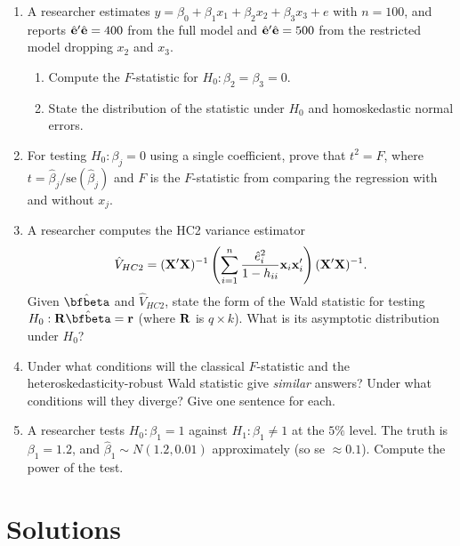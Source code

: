 \documentclass{article}
\begin{document}
\begin{enumerate}[label=\textbf{C.\arabic*},leftmargin=*,itemsep=10pt]

\item  A researcher estimates $y = \beta_0 + \beta_1 x_1 + \beta_2 x_2 + \beta_3 x_3 + e$ with $n = 100$, and reports $\hat{{\mathbf e}}'\hat{{\mathbf e}} = 400$ from the full model and $\hat{{\mathbf e}}'\hat{{\mathbf e}} = 500$ from the restricted model dropping $x_2$ and $x_3$.
\begin{enumerate}[label=(\alph*)]
  \item Compute the $F$-statistic for $H_0: \beta_2 = \beta_3 = 0$.
  \item State the distribution of the statistic under $H_0$ and homoskedastic normal errors.
\end{enumerate}

\item  For testing $H_0: \beta_j = 0$ using a single coefficient, prove that $t^2 = F$, where $t = \hat\beta_j/\text{se}(\hat\beta_j)$ and $F$ is the $F$-statistic from comparing the regression with and without $x_j$.

\item  A researcher computes the HC2 variance estimator
$$\hat V_{HC2} = ({\mathbf X}'{\mathbf X})^{-1}\left(\sum_{i=1}^n \frac{\hat e_i^2}{1 - h_{ii}}\mathbf x_i\mathbf x_i'\right)({\mathbf X}'{\mathbf X})^{-1}.$$
Given $\hat\bfbeta$ and $\hat V_{HC2}$, state the form of the Wald statistic for testing $H_0: \bfR\hat\bfbeta = \bfr$ (where ${\mathbf R}$ is $q\times k$).  What is its asymptotic distribution under $H_0$?

\item  Under what conditions will the classical $F$-statistic and the heteroskedasticity-robust Wald statistic give \emph{similar} answers?  Under what conditions will they diverge?  Give one sentence for each.

\item  A researcher tests $H_0: \beta_1 = 1$ against $H_1: \beta_1 \neq 1$ at the $5\%$ level.  The truth is $\beta_1 = 1.2$, and $\hat\beta_1 \sim N(1.2, 0.01)$ approximately (so se $\approx 0.1$).  Compute the power of the test.

\end{enumerate}

\newpage

\section*{Solutions}
\end{document}
